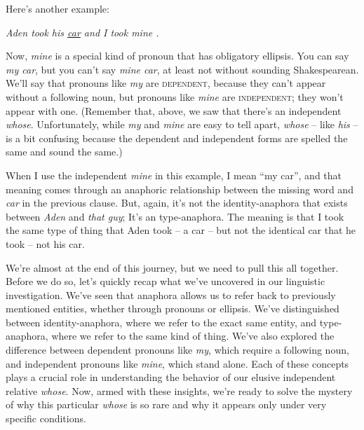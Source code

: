 Here's another example:

\ea \textit{Aden took his \uline{car} and I took mine \uline{\phantom{car}}.}\\
    \label{ex:Aden2}
\z

Now, \textit{mine} is a special kind of pronoun that has obligatory ellipsis. You can say \textit{my car}, but you can't say \textit{mine car}, at least not without sounding Shakespearean. We'll say that pronouns like \textit{my} are \textsc{dependent}, because they can't appear without a following noun, but pronouns like \textit{mine} are \textsc{independent}; they won't appear with one. (Remember that, above, we saw that there's an independent \textit{whose}. Unfortunately, while \textit{my} and \textit{mine} are easy to tell apart, \textit{whose} -- like \textit{his} -- is a bit confusing because the dependent and independent forms are spelled the same and sound the same.)

When I use the independent \textit{mine} in this example, I mean ``my car'', and that meaning comes through an anaphoric relationship between the missing word and \textit{car} in the previous clause. But, again, it's not the identity-anaphora that exists between \textit{Aden} and \textit{that guy}; It's an type-anaphora. The meaning is that I took the same type of thing that Aden took -- a car -- but not the identical car that he took -- not his car.

We're almost at the end of this journey, but we need to pull this all together. Before we do so, let's quickly recap what we've uncovered in our linguistic investigation. We've seen that anaphora allows us to refer back to previously mentioned entities, whether through pronouns or ellipsis. We've distinguished between identity-anaphora, where we refer to the exact same entity, and type-anaphora, where we refer to the same kind of thing. We've also explored the difference between dependent pronouns like \textit{my}, which require a following noun, and independent pronouns like \textit{mine}, which stand alone. Each of these concepts plays a crucial role in understanding the behavior of our elusive independent relative \textit{whose}. Now, armed with these insights, we're ready to solve the mystery of why this particular \textit{whose} is so rare and why it appears only under very specific conditions.

